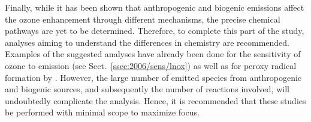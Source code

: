 Finally, while it has been shown that anthropogenic and biogenic emissions affect the ozone
enhancement through different mechanisms, the precise chemical pathways are yet to be
determined. Therefore, to complete this part of the study, analyses aiming to understand the
differences in chemistry are recommended. Examples of the suggested analyses have already
been done for the sensitivity of ozone to {\lnox} emission (see Sect.~\ref{ssec:2006/sens/lnox})
as well as for peroxy radical formation by \citet{Barth:2012qf}. However, the large number of
emitted species from anthropogenic and biogenic sources, and subsequently the number of
reactions involved, will undoubtedly complicate the analysis. Hence, it is recommended that
these studies be performed with minimal scope to maximize focus.